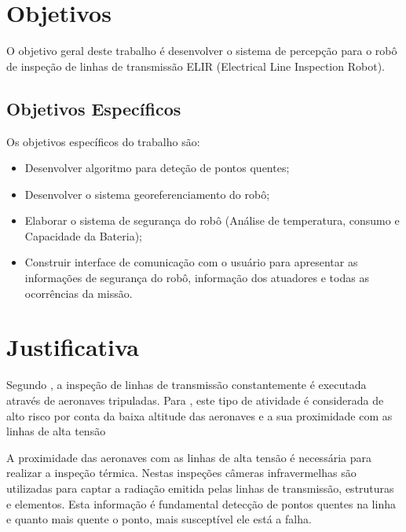 

\section{Objetivos}
\label{sec:obj}

O  objetivo geral deste  trabalho   é  desenvolver o sistema de percepção para o robô de inspeção de linhas de transmissão ELIR (Electrical Line Inspection Robot).


\subsection{Objetivos Específicos}
Os objetivos específicos do trabalho são:
\label{ssec:objesp}

\begin{itemize}
\item Desenvolver algoritmo para deteção de pontos quentes;
\item Desenvolver o sistema georeferenciamento do robô;
\item Elaborar o sistema de segurança do robô (Análise de temperatura, consumo e Capacidade da Bateria);
\item Construir interface de comunicação com o usuário para apresentar as informações de segurança do robô, informação dos atuadores e todas as ocorrências da missão.
\end{itemize}

\section{Justificativa}
\label{sec:justi}

Segundo , a inspeção de linhas de transmissão constantemente é executada através de aeronaves tripuladas. Para , este tipo de atividade é considerada de alto risco por conta da baixa altitude das aeronaves e a sua proximidade com as linhas de alta tensão %

A proximidade das aeronaves com as linhas de alta tensão é necessária para realizar a inspeção térmica. Nestas inspeções câmeras infravermelhas são utilizadas para captar a radiação emitida pelas linhas de transmissão, estruturas e elementos. Esta informação é fundamental detecção de pontos quentes na linha e quanto mais quente o ponto, mais susceptível ele está a falha.

